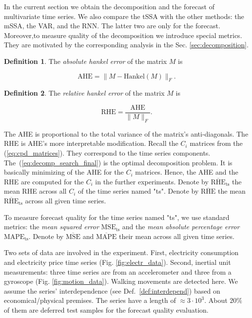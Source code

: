 \documentclass[referee, pdflatex, sn-mathphys-num]{sn-jnl}
\theoremstyle{definition}
\newtheorem{Def}{Definition}
\theoremstyle{plain}
\begin{document}
	In the current section we obtain the decomposition and the forecast of multivariate time series. We also compare the tSSA with the other methods: the mSSA, the VAR, and the RNN. The latter two are only for the forecast. Moreover,to measure quality of the decomposition we introduce special metrics. They are motivated by the corresponding analysis in the Sec. \ref{sec:decomposition}.
	
	\begin{Def}
		The \emph{absolute hankel error} of the matrix $ M $ is 
		
		\[
		\text{AHE} = \lVert M - \text{Hankel}(M) \rVert_F.
		\] 
		
	\end{Def}	
	
	\begin{Def}		
		
		The \emph{relative hankel error} of the matrix $ M $ is 
		
		\[
		\text{RHE} = \frac{\text{AHE}}{\lVert M \rVert_F}.
		\] 		
		
	\end{Def}
	
	The AHE is proportional to the total variance of the matrix's anti-diagonals. The RHE is AHE's more interpretable modification. Recall the $ C_i $ matrices from the (\ref{eq:cpd_matrices}). They correspond to the time series components. The~(\ref{eq:decomp_search_final}) is the optimal decomposition problem. It is basically minimizing of the AHE for the $ C_i $ matrices. Hence, the AHE and the RHE are computed for the $ C_i $ in the further experiments. Denote by $ \overline{\text{RHE}}_{\text{ts}} $ the mean RHE across all $ C_i $ of the time series named "ts". Denote by $ \overline{\text{RHE}} $ the mean $ \overline{\text{RHE}}_{\text{ts}} $ across all given time series.
	
	To measure forecast quality for the time series named "ts", we use standard metrics: the \emph{mean squared error} $ \text{MSE}_{\text{ts}} $ and the \emph{mean absolute percentage error} $ \text{MAPE}_{\text{ts}} $. Denote by $ \overline{\text{MSE}} $ and $ \overline{\text{MAPE}} $ their mean across all given time series.
	
	Two sets of data are involved in the experiment. First, electricity consumption and electricity price time series (Fig. \ref{fig:electr_data}). Second, inertial unit measurements: three time series are from an accelerometer and three from a gyroscope (Fig. \ref{fig:motion_data}). Walking movements are detected here. We assume the series' interdependence (see Def.~\ref{def:interdepend}) based on economical/physical premises. The series have a length of $ \approx 3 \cdot 10^3 $. About $ 20\% $ of them are deferred test samples for the forecast quality evaluation.
	
\end{document}

